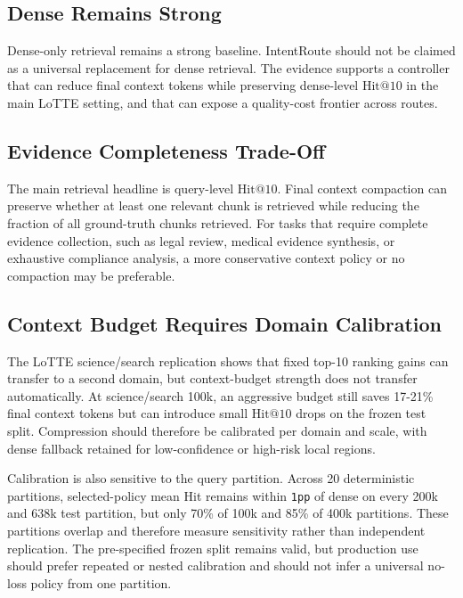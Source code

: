 \subsection{Dense Remains Strong}
\label{sec:08-limitations:dense-remains-strong}

Dense-only retrieval remains a strong baseline. IntentRoute should not be claimed as a universal replacement for dense retrieval. The evidence supports a controller that can reduce final context tokens while preserving dense-level $\mathrm{Hit@10}$ in the main LoTTE setting, and that can expose a quality-cost frontier across routes.

\subsection{Evidence Completeness Trade-Off}
\label{sec:08-limitations:evidence-completeness-trade-off}

The main retrieval headline is query-level $\mathrm{Hit@10}$. Final context compaction can preserve whether at least one relevant chunk is retrieved while reducing the fraction of all ground-truth chunks retrieved. For tasks that require complete evidence collection, such as legal review, medical evidence synthesis, or exhaustive compliance analysis, a more conservative context policy or no compaction may be preferable.

\subsection{Context Budget Requires Domain Calibration}
\label{sec:08-limitations:context-budget-requires-domain-calibration}

The LoTTE science/search replication shows that fixed top-10 ranking gains can transfer to a second domain, but context-budget strength does not transfer automatically. At science/search 100k, an aggressive budget still saves 17-21\% final context tokens but can introduce small $\mathrm{Hit@10}$ drops on the frozen test split. Compression should therefore be calibrated per domain and scale, with dense fallback retained for low-confidence or high-risk local regions.

Calibration is also sensitive to the query partition. Across 20 deterministic partitions, selected-policy mean Hit remains within \nolinkurl{1pp} of dense on every 200k and 638k test partition, but only 70\% of 100k and 85\% of 400k partitions. These partitions overlap and therefore measure sensitivity rather than independent replication. The pre-specified frozen split remains valid, but production use should prefer repeated or nested calibration and should not infer a universal no-loss policy from one partition.

